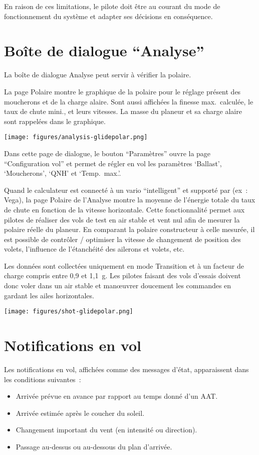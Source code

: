 En raison de ces limitations, le pilote doit être au courant du mode de fonctionnement du système et adapter ses décisions en conséquence.


\section{Boîte de dialogue ``Analyse''}

La boîte de dialogue Analyse peut servir à vérifier la polaire.

La page Polaire montre le graphique de la polaire pour le réglage présent des moucherons et de la charge alaire.
Sont aussi affichées la finesse max.\ calculée, le taux de chute mini., et leurs vitesses.
La masse du planeur et sa charge alaire sont rappelées dans le graphique.

\begin{center}
\texttt{[image: figures/analysis-glidepolar.png]}
\end{center}

Dans cette page de dialogue, le bouton ``Paramètres'' ouvre la page ``Configuration vol'' et permet de régler en vol les paramètres `Ballast', `Moucherons', `QNH' et `Temp.\ max.'.

Quand le calculateur est connecté à un vario ``intelligent'' et supporté par \xc{} (ex~: Vega), la page Polaire de l'Analyse montre la moyenne de l'énergie totale du taux de chute en fonction de la vitesse horizontale.
Cette fonctionnalité permet aux pilotes de réaliser des vols de test en air stable et vent nul afin de mesurer la polaire réelle du planeur.
En comparant la polaire constructeur à celle mesurée, il est possible de contrôler / optimiser la vitesse de changement de position des volets, l'influence de l'étanchéité des ailerons et volets, etc.

Les données sont collectées uniquement en mode Transition et à un facteur de charge compris entre 0,9 et 1,1~g.
Les pilotes faisant des vols d'essais doivent donc voler dans un air stable et manœuvrer doucement les commandes en gardant les ailes horizontales.

\begin{center}
\texttt{[image: figures/shot-glidepolar.png]}
\end{center}


\section{Notifications en vol}

Les notifications en vol, affichées comme des messages d'état, apparaissent dans les conditions suivantes~:
\begin{itemize}
\item Arrivée prévue en avance par rapport au temps donné d'un AAT.\@
\item Arrivée estimée après le coucher du soleil.
\item Changement important du vent (en intensité ou direction).
\item Passage au-dessus ou au-dessous du plan d'arrivée.
\end{itemize}
